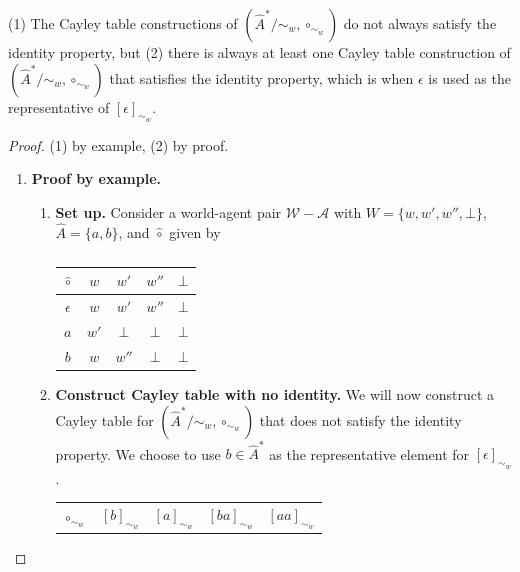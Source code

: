 \begin{proposition}
    (1) The Cayley table constructions of $(\hat{A}^{*}/\sim_{w}, \circ_{\sim_{w}})$ do not always satisfy the identity property, but (2) there is always at least one Cayley table construction of $(\hat{A}^{*}/\sim_{w}, \circ_{\sim_{w}})$ that satisfies the identity property, which is when $\epsilon$ is used as the representative of $[\epsilon]_{\sim_{w}}$.
\end{proposition}
\begin{proof}
    (1) by example, (2) by proof.
    \begin{enumerate}[(1)]
        \item \textbf{Proof by example.}
        \begin{enumerate}
            \item \textbf{Set up.}
                Consider a world-agent pair $\mathscr{W}-\mathscr{A}$ with $W = \{ w, w', w'', \bot \}$, $\hat{A} = \{a, b\}$, and $\hat{\circ}$ given by
                \begin{table}[H]
                    \centering
                    \begin{tabular}{c|cccc}
                        $\hat{\circ}$   & $w$       & $w'$      & $w''$     & $\bot$ \\
                        \hline
                        $\epsilon$      & $w$       & $w'$      & $w''$     & $\bot$ \\
                        $a$             & $w'$      & $\bot$    & $\bot$    & $\bot$ \\
                        $b$             & $w$       & $w''$     & $\bot$    & $\bot$
                    \end{tabular}
                    \caption{
                    }
                \end{table}
            \item \textbf{Construct Cayley table with no identity.}
            We will now construct a Cayley table for $(\hat{A}^{*}/\sim_{w}, \circ_{\sim_{w}})$ that does not satisfy the identity property.
            We choose to use $b \in \hat{A}^{*}$ as the representative element for $[\epsilon]_{\sim_{w}}$.
            \begin{table}[H]
                \centering
                \begin{tabular}{c|cccc}
                    $\circ_{\sim_{w}}$  & $[b]_{\sim_{w}}$  & $[a]_{\sim_{w}}$   & $[ba]_{\sim_{w}}$  & $[aa]_{\sim_{w}}$ \\

\end{tabular}
\end{table}
\end{enumerate}
\end{enumerate}
\end{proof}
